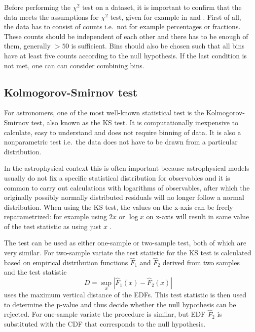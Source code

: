 \documentclass[english, oneside]{HYgradu}
\begin{document}
Before performing the $\chi^2$ test on a dataset, it is important to confirm that the data meets the assumptions for $\chi^2$ test, given for example in \citep{bock2010stats} and \citep{htk}. First of all, the data has to consist of counts i.e.\ not for example percentages or fractions. These counts should be independent of each other and there has to be enough of them, generally $>50$ is sufficient. Bins should also be chosen such that all bins have at least five counts according to the null hypothesis. If the last condition is not met, one can can consider combining bins. 


\subsection{Kolmogorov-Smirnov test}
For astronomers, one of the most well-known statistical test is the Kolmogorov-Smirnov test, also known as the KS test. It is computationally inexpensive to calculate, easy to understand and does not require binning of data. It is also a nonparametric test i.e.\ the data does not have to be drawn from a particular distribution.

In the astrophysical context this is often important because astrophysical models usually do not fix a specific statistical distribution for observables and it is common to carry out calculations with logarithms of observables, after which the originally possibly normally distributed residuals  will no longer follow a normal distribution. When using the KS test, the values on the x-axis can be freely reparametrized: for example using $2x$ or $\log x$ on x-axis will result in same value of the test statistic as using just $x$ \citep{press2007numerical}.

The test can be used as either one-sample or two-sample test, both of which are very similar. For two-sample variate the test statistic for the KS test is calculated based on empirical distribution functions $\hat{F}_1$ and $\hat{F}_2$ derived from two samples and the test statistic
\begin{equation}
	D = \sup_{x} |\hat{F}_1(x) - \hat{F}_2(x)|
\end{equation}
uses the maximum vertical distance of the EDFs. This test statistic is then used to determine the p-value and thus decide whether the null hypothesis can be rejected. For one-sample variate the procedure is similar, but EDF $\hat{F}_2$ is substituted with the CDF that corresponds to the null hypothesis.
\end{document}
